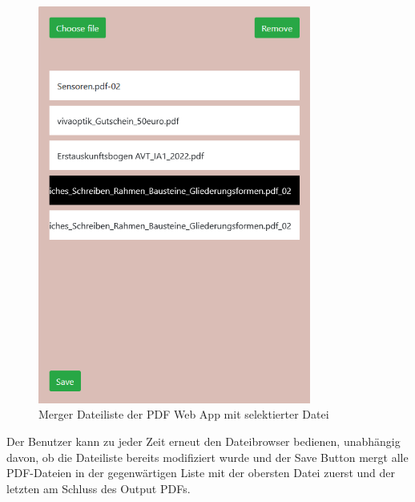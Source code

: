 \begin{figure}[!htbp]
	\centering
	\includegraphics[width=0.8\textwidth]{"images/mergelist.png"}
	\caption{Merger Dateiliste der PDF Web App mit selektierter Datei}
	\label{fig:mergelist}
\end{figure}

Der Benutzer kann zu jeder Zeit erneut den Dateibrowser bedienen, unabhängig davon, ob die Dateiliste bereits modifiziert wurde und der Save Button mergt alle PDF-Dateien in der gegenwärtigen Liste mit der obersten Datei zuerst und der letzten am Schluss des Output PDFs.


